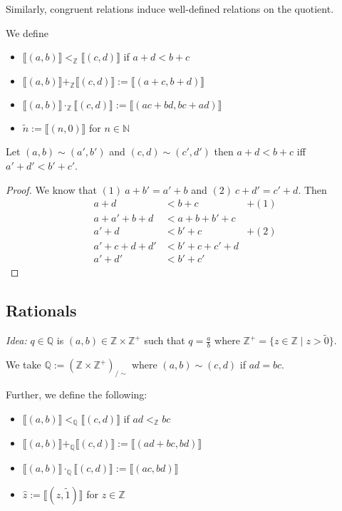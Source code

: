 \documentclass{whrartcl}
\newcommand{\NN}{\mathbb{N}}
\newcommand{\ZZ}{\mathbb{Z}}
\newcommand{\QQ}{\mathbb{Q}}
\newcommand{\cls}[1]{\llbracket #1 \rrbracket}
\begin{document}
\begin{remark}
  Similarly, congruent relations induce well-defined relations on the quotient.
\end{remark}

\begin{definition}[Operations]
  We define
  \begin{itemize}
  \item $\cls{(a, b)} <_\ZZ \cls{(c, d)}$ if $a + d < b + c$
  \item $\cls{(a, b)} +_\ZZ \cls{(c, d)} := \cls{(a + c, b + d)}$
  \item $\cls{(a, b)} \cdot_\ZZ \cls{(c, d)} := \cls{(ac + bd,bc + ad)}$
  \item $\tilde{n} := \cls{(n, 0)}$ for $n \in \NN$
  \end{itemize}
\end{definition}

\begin{proposition}
  Let $(a, b) \sim (a', b')$ and $(c, d) \sim (c', d')$ then $a + d < b + c$ iff
  $a' + d' < b' + c'$.
\end{proposition}
\begin{proof}
  We know that $(1)~a + b' = a' + b$ and $(2)~c + d' = c' + d$. Then
  \begin{align*}
    a + d &< b + c & +(1) \\
    a + a' + b + d &< a + b + b' + c \\
    a' + d &< b' + c & +(2) \\
    a' + c + d + d' &< b' + c + c' + d \\
    a' + d' &< b' + c'
  \end{align*}
\end{proof}

\subsection{Rationals}

\emph{Idea:} $q \in \QQ$ is $(a, b) \in \ZZ \times \ZZ^+$ such that $q = \frac a
b$ where $\ZZ^+ = \{z \in \ZZ \mid z > \tilde{0}\}$.

\begin{definition}
  We take $\QQ := (\ZZ \times \ZZ^+)_{/ \sim}$ where $(a, b) \sim (c, d)$ if $ad
  = bc$.

  Further, we define the following:
  \begin{itemize}
  \item $\cls{(a, b)} <_\QQ \cls{(c, d)}$ if $ad <_\ZZ bc$
  \item $\cls{(a, b)} +_\QQ \cls{(c, d)} := \cls{(ad + bc, bd)}$
  \item $\cls{(a, b)} \cdot_\QQ \cls{(c, d)} := \cls{(ac, bd)}$
  \item $\hat{z} := \cls{(z, \tilde{1})}$ for $z \in \ZZ$
  \end{itemize}
\end{definition}
\end{document}
